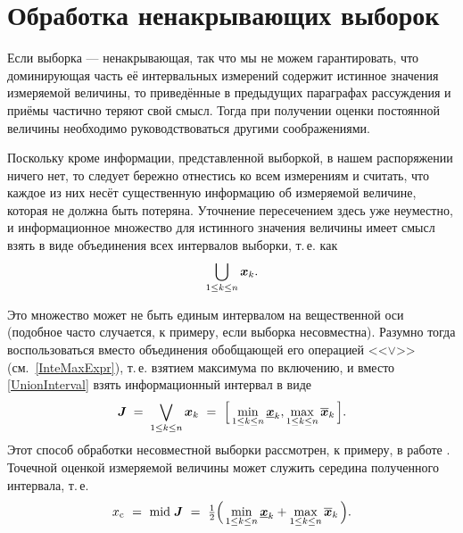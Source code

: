 \documentclass[a5paper,openany]{book}
\newcommand{\mbf}[1]{\protect\text{\boldmath$#1$}}
\newcommand{\ov}{\overline}
\newcommand{\un}{\underline}
\newcommand{\m}{\mathrm{mid}\;}
\begin{document}
\section{Обработка ненакрывающих выборок} 
\label{NonCoverSampleSect} 
  
Если выборка --- ненакрывающая, так что мы не можем гарантировать, что доминирующая 
часть её интервальных измерений содержит истинное значения измеряемой величины, то 
приведённые в предыдущих параграфах рассуждения и приёмы частично теряют свой смысл. 
Тогда при получении оценки постоянной величины необходимо руководствоваться другими 
соображениями. 
  
Поскольку кроме информации, представленной выборкой, в нашем распоряжении ничего нет, 
то следует бережно отнестись ко всем измерениям и считать, что каждое из них несёт 
существенную информацию об измеряемой величине, которая не должна быть потеряна. 
Уточнение пересечением здесь уже неуместно, и информационное множество для истинного 
значения величины имеет смысл взять в виде объединения всех интервалов выборки, 
т.\,е. как 
\begin{equation} 
\label{UnionInterval} 
\bigcup_{1\leq k\leq n} \mbf{x}_{k}. 
\end{equation} 
  
Это множество может не быть единым интервалом на вещественной оси (подобное часто 
случается, к примеру, если выборка несовместна). Разумно тогда воспользоваться 
вместо объединения обобщающей его операцией <<$\vee$>> (см.~\eqref{InteMaxExpr}), 
т.\,е. взятием максимума по включению, и вместо \eqref{UnionInterval} взять 
информационный интервал в виде 
\begin{equation} 
\label{UNInterval} 
\mbf{J}\; = \;\bigvee_{1\leq k\leq n} \mbf{x}_{k} \ 
= \  \Bigl[\,\min_{1\leq k\leq n} \un{\mbf{x}}_{k}, 
             \max_{1\leq k\leq n} \ov{\mbf{x}}_{k}\,\Bigr]. 
\end{equation} 
Этот способ обработки несовместной выборки рассмотрен, к примеру, в работе 
\cite{Artbauer}. Точечной оценкой измеряемой величины может служить середина 
полученного интервала, т.\,е. 
\begin{equation} \label{midUNInterval} 
x_\text{c} \  = \  \m\mbf{J} \   
= \  \tfrac{1}{2} \Bigl(\,\min_{1\leq k\leq n} \un{\mbf{x}}_{k} + 
                          \max_{1\leq k\leq n} \ov{\mbf{x}}_{k}\,\Bigr). 
\end{equation} 
    
  
\end{document}
